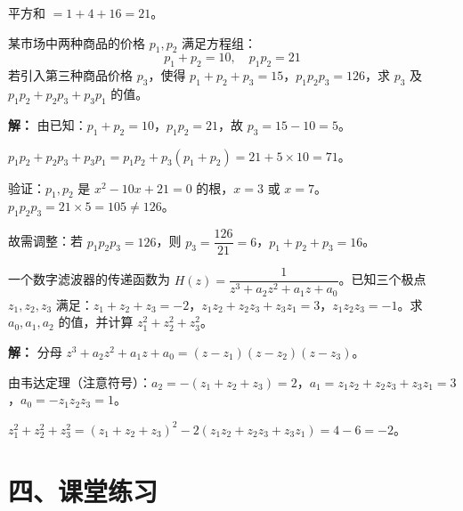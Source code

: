 \documentclass[12pt, a4paper]{ctexart}
\begin{document}
平方和 $= 1 + 4 + 16 = 21$。

\begin{appbox}[【应用2】经济模型中的均衡价格]
某市场中两种商品的价格 $p_1, p_2$ 满足方程组：
\[
p_1 + p_2 = 10,\quad p_1 p_2 = 21
\]
若引入第三种商品价格 $p_3$，使得 $p_1 + p_2 + p_3 = 15$，$p_1 p_2 p_3 = 126$，求 $p_3$ 及 $p_1 p_2 + p_2 p_3 + p_3 p_1$ 的值。
\end{appbox}

\textbf{解：} 由已知：$p_1+p_2=10$，$p_1p_2=21$，故 $p_3 = 15 - 10 = 5$。

$p_1 p_2 + p_2 p_3 + p_3 p_1 = p_1 p_2 + p_3(p_1+p_2) = 21 + 5 \times 10 = 71$。

验证：$p_1, p_2$ 是 $x^2 - 10x + 21 = 0$ 的根，$x=3$ 或 $x=7$。$p_1 p_2 p_3 = 21 \times 5 = 105 \neq 126$。

故需调整：若 $p_1 p_2 p_3 = 126$，则 $p_3 = \dfrac{126}{21} = 6$，$p_1+p_2+p_3 = 16$。

\begin{appbox}[【应用3】信号处理中的滤波器设计]
一个数字滤波器的传递函数为 $H(z) = \dfrac{1}{z^3 + a_2 z^2 + a_1 z + a_0}$。已知三个极点 $z_1, z_2, z_3$ 满足：$z_1+z_2+z_3=-2$，$z_1z_2+z_2z_3+z_3z_1=3$，$z_1z_2z_3=-1$。求 $a_0, a_1, a_2$ 的值，并计算 $z_1^2+z_2^2+z_3^2$。
\end{appbox}

\textbf{解：} 分母 $z^3+a_2z^2+a_1z+a_0 = (z-z_1)(z-z_2)(z-z_3)$。

由韦达定理（注意符号）：$a_2 = -(z_1+z_2+z_3) = 2$，$a_1 = z_1z_2+z_2z_3+z_3z_1 = 3$，$a_0 = -z_1z_2z_3 = 1$。

$z_1^2+z_2^2+z_3^2 = (z_1+z_2+z_3)^2 - 2(z_1z_2+z_2z_3+z_3z_1) = 4 - 6 = -2$。

\section*{\textcolor{tipgreen}{四、课堂练习}}
\end{document}
